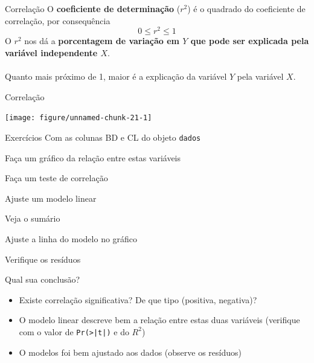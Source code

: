 \documentclass[10pt]{beamer}\usepackage[]{graphicx}\usepackage[]{color}
\newenvironment{knitrout}{}{} %
\theoremstyle{definition}
\begin{document}

\begin{frame}[fragile]{Correlação}
  O \textbf{coeficiente de determinação} ($r^2$) é o quadrado do
  coeficiente de correlação, por consequência
  \begin{equation*}
    0 \leq r^2 \leq 1
  \end{equation*}
  O $r^2$ nos dá a \textbf{porcentagem de variação em $Y$ que pode ser explicada
  pela variável independente $X$}. \\~\\
  Quanto mais próximo de 1, maior é a explicação da variável $Y$ pela
  variável $X$.
\end{frame}

\begin{frame}[fragile]{Correlação}
\begin{knitrout}\small
{}\color{fgcolor}

{\centering \texttt{[image: figure/unnamed-chunk-21-1]} 

}



\end{knitrout}
\end{frame}

\begin{frame}[fragile=singleslide]{Exercícios}
Com as colunas BD e CL do objeto \texttt{dados}
\begin{compactenum}[(1)]
\item Faça um gráfico da relação entre estas variáveis
\item Faça um teste de correlação
\item Ajuste um modelo linear
  \begin{compactenum}[(a)]
  \item Veja o sumário
  \item Ajuste a linha do modelo no gráfico
  \item Verifique os resíduos
  \end{compactenum}
\end{compactenum}
Qual sua conclusão?
\small
\begin{itemize}
\item Existe correlação significativa? De que tipo (positiva, negativa)?
\item O modelo linear descreve bem a relação entre estas duas variáveis
  (verifique com o valor de \verb+Pr(>|t|)+ e do $R^2$)
\item O modelos foi bem ajustado aos dados (observe os resíduos)
\end{itemize}
\end{frame}
\end{document}
